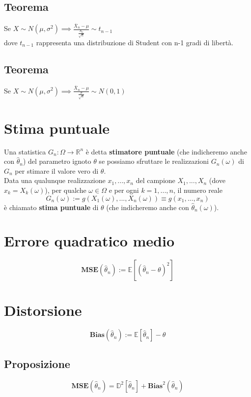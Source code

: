 \documentclass{article}
\begin{document}
\subsection*{Teorema}
Se $X \sim N(\mu, \sigma^{2}) \implies \frac{\overline{X}_{n} - \mu}{\frac{S_{n}}{\sqrt{n}}} \sim t_{n-1}$\\
dove $t_{n-1}$ rappresenta una distribuzione di Student con n-1 gradi di libertà.

\subsection*{Teorema}
Se $X \sim N(\mu, \sigma^{2}) \implies \frac{\overline{X}_{n} - \mu}{\frac{\sigma}{\sqrt{n}}} \sim N(0,1)$

\section*{Stima puntuale}
Una statistica $G_{n}: \Omega \to \mathbb{R}^{n}$ è detta \textbf{stimatore puntuale} (che indicheremo anche con $\hat{\theta}_{n}$) del parametro ignoto $\theta$ se possiamo sfruttare le realizzazioni $G_{n}(\omega)$ di $G_{n}$ per stimare il valore vero di $\theta$.\\
Data una qualunque realizzazione $x_{1},...,x_{n}$ del campione $X_{1},...,X_{n}$ (dove $x_{k} = X_{k}(\omega)$), per qualche $\omega \in \Omega$ e per ogni $k=1,...,n$, il numero reale
\[ G_{n}(\omega) := g(X_{1}(\omega),...,X_{n}(\omega)) \equiv g(x_{1},...,x_{n}) \]
è chiamato \textbf{stima puntuale} di $\theta$ (che indicheremo anche con $\hat{\theta}_{n}(\omega)$).

\section*{Errore quadratico medio}
\[ \textbf{MSE}(\hat{\theta}_{n}) := \mathbb{E}[(\hat{\theta}_{n} - \theta)^{2}] \]

\section*{Distorsione}
\[ \textbf{Bias}(\hat{\theta}_{n}) := \mathbb{E}[\hat{\theta}_{n}] - \theta \]

\subsection*{Proposizione}
\[ \textbf{MSE}(\hat{\theta}_{n}) = \mathbb{D}^{2}[\hat{\theta}_{n}] + \textbf{Bias}^{2}(\hat{\theta}_{n}) \]
\end{document}
